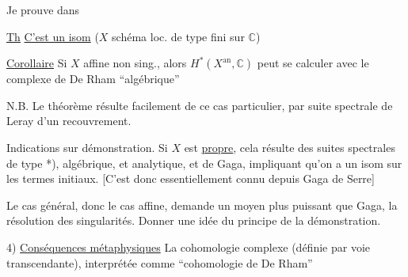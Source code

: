 Je prouve dans 

\uline{Th} \uline{C'est un isom} ($X$ schéma loc. de type fini  sur $\mathbb C$)

\uline{Corollaire} 
Si $X$ affine non sing., alors $H^*(X^{\mathrm{an}},\mathbb C)$ peut se calculer avec le complexe de De Rham ``algébrique''

N.B. Le théorème résulte facilement de ce cas particulier, par suite spectrale de Leray d'un recouvrement.

Indications sur démonstration. Si $X$ est \uline{propre}, cela résulte des suites spectrales de type *), algébrique, et analytique, et de Gaga, impliquant qu'on a un isom sur les termes initiaux. [C'est donc essentiellement connu depuis Gaga de Serre]

Le cas général, donc  le cas affine, demande un moyen plus puissant que Gaga, la résolution des singularités. Donner  une idée du principe de la démonstration.

4) \uline{Conséquences métaphysiques}  La cohomologie complexe (définie par voie transcendante), interprétée comme ``cohomologie de De Rham''
